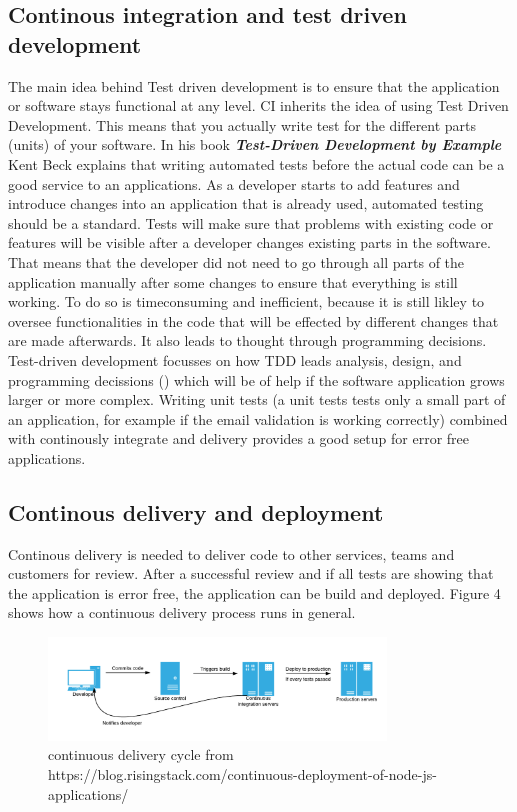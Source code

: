 \subsection{Continous integration and test driven development}
The main idea behind Test driven development is to ensure that the application or software stays functional at any level.
CI inherits the idea of using Test Driven Development. This means that you actually write test for the different parts (units) of your software.
In his book \textbf{\textit{Test-Driven Development by Example}} Kent Beck explains that writing automated tests before the actual code can be a good service
to an applications. As a developer starts to add features and introduce changes into an application that is already used, automated testing should be a standard.
Tests will make sure that problems with existing code or features will be visible after a developer changes existing parts in the software. That means that the
developer did not need to go through all parts of the application manually after some changes to ensure that everything is still working. To do so is timeconsuming
and inefficient, because it is still likley to oversee functionalities in the code that will be effected by different changes that are made afterwards. It also
leads to thought through programming decisions. Test-driven development focusses on how TDD leads analysis, design, and programming decissions
(\cite{janzen2005test}) which will be of help if the software application grows larger or more complex. Writing unit tests (a unit tests tests only a small
part of an application, for example if the email validation is working correctly) combined with continously integrate and delivery provides a
good setup for error free applications.

\subsection{Continous delivery and deployment}
Continous delivery is needed to deliver code to other services, teams and customers for review. After a successful review and if all tests are showing that the
application is error free, the application can be build and deployed. Figure 4 shows how a continuous delivery process runs in general.

\begin{figure}[h!]
  \centering
  \includegraphics[width=0.8\textwidth]{images/cd.png}
  \caption{continuous delivery cycle from https://blog.risingstack.com/continuous-deployment-of-node-js-applications/}
\end{figure}

